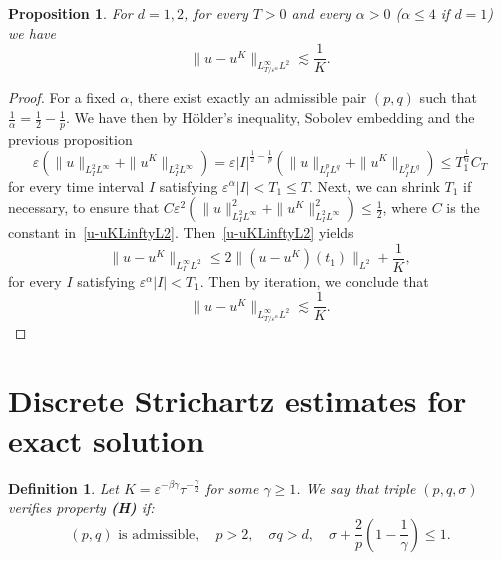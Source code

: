 \documentclass[10pt,a4paper]{article}
\newtheorem{definition}[theorem]{Definition}
\newtheorem{proposition}[theorem]{Proposition}
\begin{document}
  \begin{proposition}\label{u-uKLinftyL2d12}
    For \(d=1,2\), for every \(T>0\) and every \(\alpha>0\) (\(\alpha \leq 4\) if \(d=1\)) 
    we have 
    \begin{equation}
      \|u-u^K\|_{L^\infty_{T/\varepsilon^\alpha}L^2} \lesssim \frac1K.
    \end{equation}
  \end{proposition}

  \begin{proof}
    For a fixed \(\alpha\), there exist exactly an admissible pair \((p,q)\) such 
    that \(\frac1\alpha = \frac12 - \frac1p\). We have then by H\"older's 
    inequality, Sobolev embedding and the previous proposition 
    \begin{equation}\label{uL2Linfty}
      \varepsilon (\|u\|_{L^2_I L^\infty} + \|u^K\|_{L^2_I L^\infty}) = 
      \varepsilon |I|^{\frac12-\frac1p} (\|u\|_{L^p_I L^q} + \|u^K\|_{L^p_I L^q}) 
      \leq T_1^{\frac1\alpha} C_T
    \end{equation}
    for every time interval \(I\) satisfying \(\varepsilon^\alpha |I| <
    T_1 \leq T\).
    Next, we can shrink \(T_1\) if necessary, to ensure that
    \(C\varepsilon^2 (\|u\|_{L^2_I L^\infty}^2 + \|u^K\|_{L^2_I L^\infty}^2)
    \leq \frac12\), where \(C\) is the constant in~\eqref{u-uKLinftyL2}. 
    Then~\eqref{u-uKLinftyL2} yields 
    \[ \|u-u^K\|_{L^\infty_I L^2} \leq 2\|(u-u^K)(t_1)\|_{L^2} + \frac1K, \]
    for every \(I\) satisfying \(\varepsilon^\alpha |I| < T_1\). Then by
    iteration, we conclude that 
    \[ \|u-u^K\|_{L^\infty_{T/\varepsilon^\alpha}L^2} \lesssim \frac1K. \]
  \end{proof}

  \section{Discrete Strichartz estimates for exact solution}\label{sec:DSE-exact-sol}


  \begin{definition}
    Let \(K=\varepsilon^{-\beta\gamma}\tau^{-\frac\gamma2}\) for some \(\gamma
    \geq 1\). We say that triple \((p,q,\sigma)\) verifies property {\bf (H)}
    if:
    \[ (p,q) \text{ is admissible}, \quad p>2,\quad \sigma q > d, \quad 
    \sigma + \frac2p\left(1-\frac1\gamma\right) \leq 1 .
    \]
  \end{definition}
\end{document}
